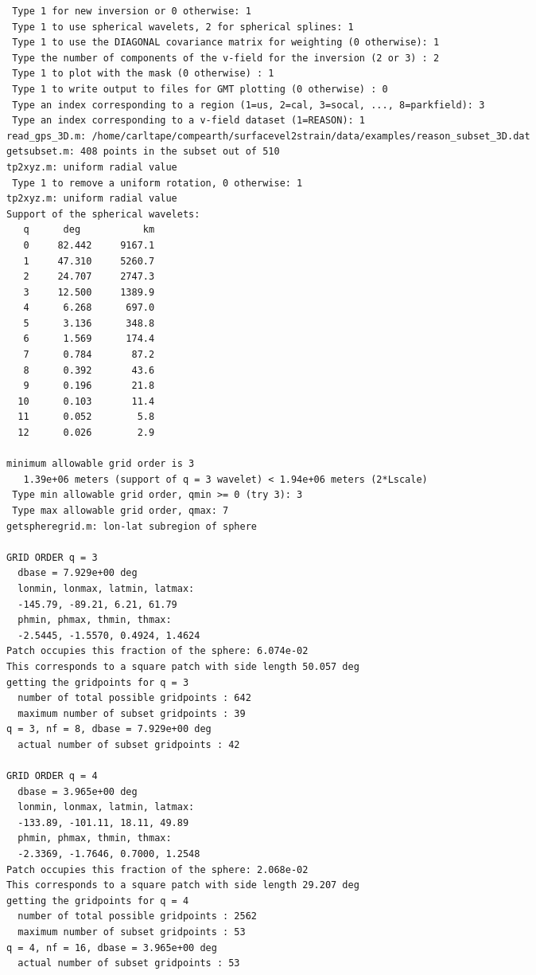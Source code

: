 \documentclass[11pt,titlepage,fleqn]{article}
\begin{document}
\begin{spacing}{1.0}
\begin{verbatim}
 Type 1 for new inversion or 0 otherwise: 1
 Type 1 to use spherical wavelets, 2 for spherical splines: 1
 Type 1 to use the DIAGONAL covariance matrix for weighting (0 otherwise): 1
 Type the number of components of the v-field for the inversion (2 or 3) : 2
 Type 1 to plot with the mask (0 otherwise) : 1
 Type 1 to write output to files for GMT plotting (0 otherwise) : 0
 Type an index corresponding to a region (1=us, 2=cal, 3=socal, ..., 8=parkfield): 3
 Type an index corresponding to a v-field dataset (1=REASON): 1
read_gps_3D.m: /home/carltape/compearth/surfacevel2strain/data/examples/reason_subset_3D.dat
getsubset.m: 408 points in the subset out of 510
tp2xyz.m: uniform radial value
 Type 1 to remove a uniform rotation, 0 otherwise: 1
tp2xyz.m: uniform radial value
Support of the spherical wavelets:
   q      deg           km
   0     82.442     9167.1
   1     47.310     5260.7
   2     24.707     2747.3
   3     12.500     1389.9
   4      6.268      697.0
   5      3.136      348.8
   6      1.569      174.4
   7      0.784       87.2
   8      0.392       43.6
   9      0.196       21.8
  10      0.103       11.4
  11      0.052        5.8
  12      0.026        2.9
  
minimum allowable grid order is 3
   1.39e+06 meters (support of q = 3 wavelet) < 1.94e+06 meters (2*Lscale)
 Type min allowable grid order, qmin >= 0 (try 3): 3
 Type max allowable grid order, qmax: 7
getspheregrid.m: lon-lat subregion of sphere
  
GRID ORDER q = 3
  dbase = 7.929e+00 deg
  lonmin, lonmax, latmin, latmax:
  -145.79, -89.21, 6.21, 61.79
  phmin, phmax, thmin, thmax:
  -2.5445, -1.5570, 0.4924, 1.4624
Patch occupies this fraction of the sphere: 6.074e-02
This corresponds to a square patch with side length 50.057 deg
getting the gridpoints for q = 3
  number of total possible gridpoints : 642
  maximum number of subset gridpoints : 39
q = 3, nf = 8, dbase = 7.929e+00 deg
  actual number of subset gridpoints : 42
  
GRID ORDER q = 4
  dbase = 3.965e+00 deg
  lonmin, lonmax, latmin, latmax:
  -133.89, -101.11, 18.11, 49.89
  phmin, phmax, thmin, thmax:
  -2.3369, -1.7646, 0.7000, 1.2548
Patch occupies this fraction of the sphere: 2.068e-02
This corresponds to a square patch with side length 29.207 deg
getting the gridpoints for q = 4
  number of total possible gridpoints : 2562
  maximum number of subset gridpoints : 53
q = 4, nf = 16, dbase = 3.965e+00 deg
  actual number of subset gridpoints : 53
  

\end{verbatim}
\end{spacing}
\end{document}
